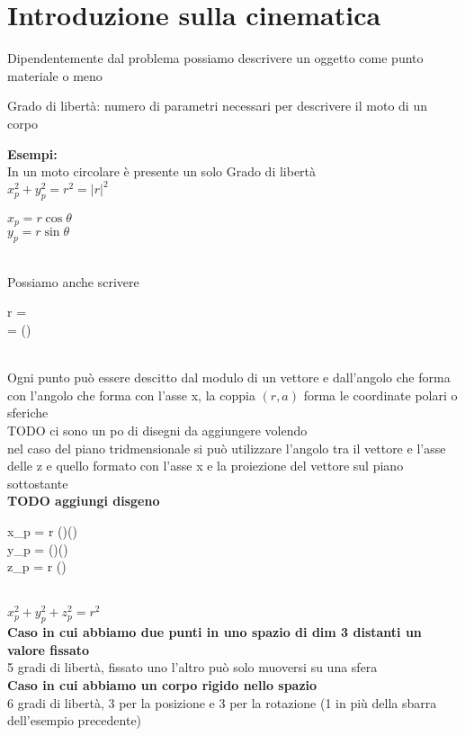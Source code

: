 \documentclass[12px]{article}
\begin{document}
		\section{Introduzione sulla cinematica}
		Dipendentemente dal problema possiamo descrivere un oggetto come punto materiale o meno
		\begin{defi}
			Grado di libertà: numero di parametri necessari per descrivere il moto di un corpo
		\end{defi}
		\textbf{Esempi:}\\
		In un moto circolare è presente un solo Grado di libertà\\
		$x_p^2 + y_p^2 = r^2 = |r|^2$\\
		\begin{cases}
			$x_p = r \cos\theta$\\
			$y_p = r \sin\theta$
		\end{cases}\\[10px]
		Possiamo anche scrivere \\[10px]
		\begin{cases}
			r = \\
			\theta = \arctan ()
		\end{cases}\\[10px]
		Ogni punto può essere descitto dal modulo di un vettore e dall'angolo che forma con l'angolo che forma con l'asse x, la coppia $(r,a)$ forma le coordinate polari o sferiche\\
		TODO ci sono un po di disegni da aggiungere volendo\\
		nel caso del piano tridmensionale si può utilizzare l'angolo tra il vettore e l'asse delle z e quello formato con l'asse x e la proiezione del vettore sul piano sottostante\\
		\textbf{TODO aggiungi disgeno}\\
		\newpage
		\begin{cases}
			x_p = r \sin(\varphi)\cos(\theta)\\
			y_p = \sin (\varphi)\sin(\theta)\\
			z_p = r \cos(\varphi)\\
		\end{cases}\\[10px]
		$x_p^2 +y_p^2 + z_p^2 = r^2$\\
		\textbf{Caso in cui abbiamo due punti in uno spazio di dim 3 distanti un valore fissato}\\
		5 gradi di libertà, fissato uno l'altro può solo muoversi su una sfera\\
		\textbf{Caso in cui abbiamo un corpo rigido nello spazio}\\
		6 gradi di libertà, 3 per la posizione e 3 per la rotazione (1 in più della sbarra dell'esempio precedente)\\
\end{document}
